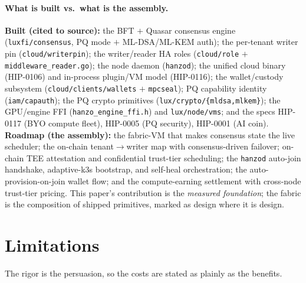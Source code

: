 \documentclass[11pt]{article}
\begin{document}
\paragraph{What is built vs.\ what is the assembly.}
\label{sec:builtvroadmap}
\textbf{Built (cited to source):} the BFT $+$ Quasar consensus engine (\texttt{luxfi/consensus},
PQ mode $+$ ML-DSA/ML-KEM auth); the per-tenant writer pin (\texttt{cloud/writerpin}); the
writer/reader HA roles (\texttt{cloud/role} $+$ \texttt{middleware\_reader.go}); the node daemon
(\texttt{hanzod}); the unified cloud binary (HIP-0106) and in-process plugin/VM model (HIP-0116);
the wallet/custody subsystem (\texttt{cloud/clients/wallets} $+$ \texttt{mpcseal}); PQ capability
identity (\texttt{iam/capauth}); the PQ crypto primitives (\texttt{lux/crypto/\{mldsa,mlkem\}});
the GPU/engine FFI (\texttt{hanzo\_engine\_ffi.h}) and \texttt{lux/node/vms}; and the specs
HIP-0117 (BYO compute fleet), HIP-0005 (PQ security), HIP-0001 (AI coin).
\textbf{Roadmap (the assembly):} the fabric-VM that makes consensus state the live scheduler; the
on-chain tenant$\to$writer map with consensus-driven failover; on-chain TEE attestation and
confidential trust-tier scheduling; the \texttt{hanzod} auto-join handshake, adaptive-k3s
bootstrap, and self-heal orchestration; the auto-provision-on-join wallet flow; and the
compute-earning settlement with cross-node trust-tier pricing. This paper's contribution is the
\emph{measured foundation}; the fabric is the composition of shipped primitives, marked as design
where it is design.
\fussy

\section{Limitations}
\label{sec:limits}
The rigor is the persuasion, so the costs are stated as plainly as the benefits.
\end{document}
